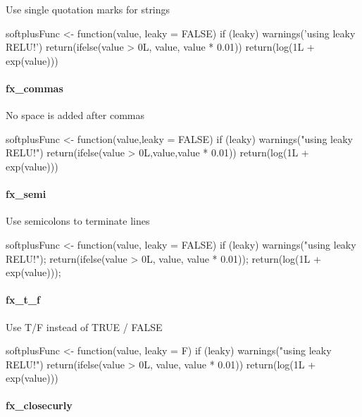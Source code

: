 Use single quotation marks for strings

\begin{example}
softplusFunc <- function(value, leaky = FALSE) {
    if (leaky) {
        warnings('using leaky RELU!')
        return(ifelse(value > 0L, value, value * 0.01))
    }
    return(log(1L + exp(value)))
}
\end{example}

\paragraph{fx\_commas}

No space is added after commas

\begin{example}
softplusFunc <- function(value,leaky = FALSE) {
    if (leaky) {
        warnings("using leaky RELU!")
        return(ifelse(value > 0L,value,value * 0.01))
    }
    return(log(1L + exp(value)))
}
\end{example}

\paragraph{fx\_semi}

Use semicolons to terminate lines

\begin{example}
softplusFunc <- function(value, leaky = FALSE) {
    if (leaky) {
        warnings("using leaky RELU!");
        return(ifelse(value > 0L, value, value * 0.01));
    }
    return(log(1L + exp(value)));
}
\end{example}

\paragraph{fx\_t\_f}

Use T/F instead of TRUE / FALSE

\begin{example}
softplusFunc <- function(value, leaky = F) {
    if (leaky) {
        warnings("using leaky RELU!")
        return(ifelse(value > 0L, value, value * 0.01))
    }
    return(log(1L + exp(value)))
}
\end{example}

\paragraph{fx\_closecurly}

